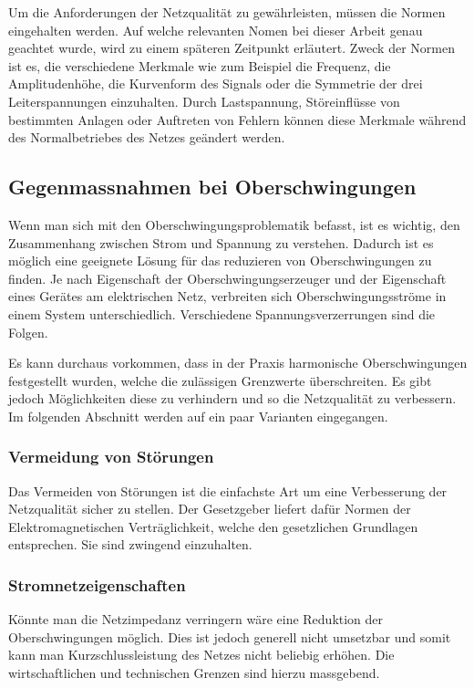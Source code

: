 Um die Anforderungen der Netzqualität zu gewährleisten, müssen die Normen eingehalten werden. Auf welche relevanten Nomen bei dieser Arbeit genau geachtet wurde, wird zu einem späteren Zeitpunkt erläutert. Zweck der Normen  ist es,  die verschiedene Merkmale wie zum Beispiel  die Frequenz, die Amplitudenhöhe, die Kurvenform des Signals oder die Symmetrie der drei Leiterspannungen einzuhalten. Durch Lastspannung, Störeinflüsse von bestimmten Anlagen oder Auftreten von Fehlern können diese Merkmale während des Normalbetriebes des Netzes geändert werden. 


\subsection{Gegenmassnahmen bei Oberschwingungen}

Wenn man sich mit den Oberschwingungsproblematik befasst, ist es wichtig, den Zusammenhang zwischen Strom und Spannung zu verstehen. Dadurch ist es möglich eine geeignete Lösung für das reduzieren von Oberschwingungen zu finden. 
Je nach Eigenschaft der Oberschwingungserzeuger und der Eigenschaft eines Gerätes am elektrischen Netz, verbreiten sich Oberschwingungsströme in einem System unterschiedlich. Verschiedene Spannungsverzerrungen sind die Folgen. 

Es kann durchaus vorkommen, dass in der Praxis harmonische Oberschwingungen festgestellt wurden, welche die zulässigen Grenzwerte überschreiten. Es gibt jedoch Möglichkeiten diese zu verhindern und so die Netzqualität zu verbessern. Im folgenden Abschnitt werden auf ein paar Varianten eingegangen.

\subsubsection{Vermeidung von Störungen}
Das Vermeiden von Störungen ist die einfachste Art um eine Verbesserung der Netzqualität sicher zu stellen. Der Gesetzgeber liefert dafür Normen der Elektromagnetischen Verträglichkeit, welche den gesetzlichen Grundlagen entsprechen. Sie sind zwingend einzuhalten.
\subsubsection{Stromnetzeigenschaften}
Könnte man die Netzimpedanz verringern wäre eine Reduktion der Oberschwingungen möglich. Dies ist jedoch generell nicht umsetzbar und somit kann man Kurzschlussleistung des Netzes nicht beliebig erhöhen. Die wirtschaftlichen und technischen Grenzen sind hierzu massgebend.  


